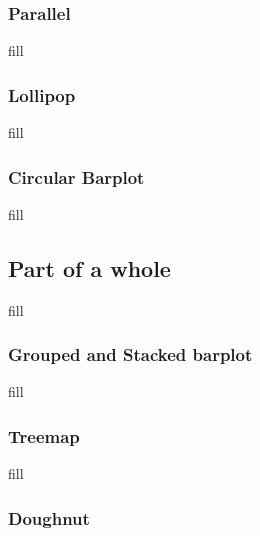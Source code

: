 \documentclass[
  b5paper]{book}
\begin{document}
\hypertarget{parallel}{%
\subsubsection*{Parallel}\label{parallel}}

fill

\hypertarget{lollipop}{%
\subsubsection*{Lollipop}\label{lollipop}}

fill

\hypertarget{circular-barplot}{%
\subsubsection*{Circular Barplot}\label{circular-barplot}}

fill

\hypertarget{part-of-a-whole}{%
\subsection*{Part of a whole}\label{part-of-a-whole}}

fill

\hypertarget{grouped-and-stacked-barplot}{%
\subsubsection*{Grouped and Stacked barplot}\label{grouped-and-stacked-barplot}}

fill

\hypertarget{treemap}{%
\subsubsection*{Treemap}\label{treemap}}

fill

\hypertarget{doughnut}{%
\subsubsection*{Doughnut}\label{doughnut}}
\end{document}
